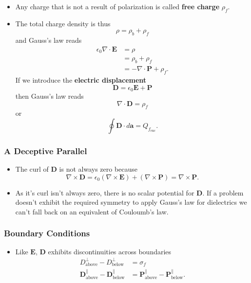 \documentclass{article}
\renewcommand{\vec}[1]{\boldsymbol{\mathbf{#1}}}
\begin{document}
\begin{itemize}
  \item Any charge that is not a result of polarization is called \textbf{free charge} $\rho_f$.

  \item The total charge density is thus \[\rho = \rho_b + \rho_f\] and Gauss's law reads \begin{align*}
          \epsilon_0 \nabla \cdot \vec{E} & = \rho                            \\
                                          & = \rho_b + \rho_f                 \\
                                          & = -\nabla \cdot \vec{P} + \rho_f.
        \end{align*} If we introduce the \textbf{electric displacement} \[\vec{D} = \epsilon_0 \vec{E} + \vec{P}\] then Gauss's law reads \[\nabla \cdot \vec{D} = \rho_f\] or \[\oint \vec{D} \cdot d \vec{a} = Q_{f_\text{enc}}.\]
\end{itemize}

\subsubsection{A Deceptive Parallel}

\begin{itemize}
  \item The curl of $\vec{D}$ is not always zero because \[\nabla \times \vec{D} = \epsilon_0 (\nabla \times \vec{E}) + (\nabla \times \vec{P}) = \nabla \times \vec{P}.\]

  \item As it's curl isn't always zero, there is no scalar potential for $\vec{D}$. If a problem doesn't exhibit the required symmetry to apply Gauss's law for dielectrics we can't fall back on an equivalent of Couloumb's law.
\end{itemize}

\subsubsection{Boundary Conditions}

\begin{itemize}
  \item Like $\vec{E}$, $\vec{D}$ exhibits discontinuities across boundaries \begin{align*}
          D_\text{above}^\perp - D_\text{below}^\perp                     & = \sigma_f                                                         \\
          \vec{D}_\text{above}^\parallel - \vec{D}_\text{below}^\parallel & = \vec{P}_\text{above}^\parallel - \vec{P}_\text{below}^\parallel.
        \end{align*}
\end{itemize}
\end{document}
